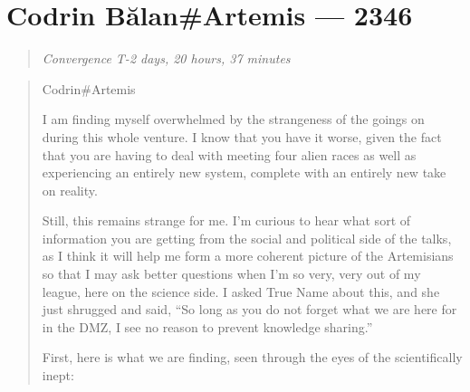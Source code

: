\hypertarget{codrin-bux103lanartemis-2346}{%
\chapter{Codrin Bălan\#Artemis — 2346}\label{codrin-bux103lanartemis-2346}}

\begin{quote}
\emph{Convergence T-2 days, 20 hours, 37 minutes}
\end{quote}

\begin{quote}
Codrin\#Artemis

I am finding myself overwhelmed by the strangeness of the goings on during this whole venture. I know that you have it worse, given the fact that you are having to deal with meeting four alien races as well as experiencing an entirely new system, complete with an entirely new take on reality.

Still, this remains strange for me. I'm curious to hear what sort of information you are getting from the social and political side of the talks, as I think it will help me form a more coherent picture of the Artemisians so that I may ask better questions when I'm so very, very out of my league, here on the science side. I asked True Name about this, and she just shrugged and said, ``So long as you do not forget what we are here for in the DMZ, I see no reason to prevent knowledge sharing.''

First, here is what we are finding, seen through the eyes of the scientifically inept:


\end{quote}
